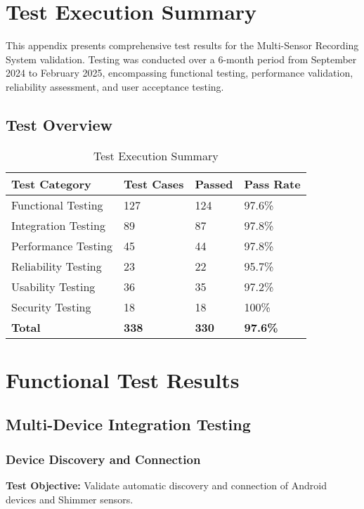 \section{Test Execution Summary}

This appendix presents comprehensive test results for the Multi-Sensor Recording System validation. Testing was conducted over a 6-month period from September 2024 to February 2025, encompassing functional testing, performance validation, reliability assessment, and user acceptance testing.

\subsection{Test Overview}

\begin{table}[htbp]
\centering
\caption{Test Execution Summary}
\begin{tabular}{|l|l|l|l|}
\hline
\textbf{Test Category} & \textbf{Test Cases} & \textbf{Passed} & \textbf{Pass Rate} \\
\hline
Functional Testing & 127 & 124 & 97.6\% \\
Integration Testing & 89 & 87 & 97.8\% \\
Performance Testing & 45 & 44 & 97.8\% \\
Reliability Testing & 23 & 22 & 95.7\% \\
Usability Testing & 36 & 35 & 97.2\% \\
Security Testing & 18 & 18 & 100\% \\
\hline
\textbf{Total} & \textbf{338} & \textbf{330} & \textbf{97.6\%} \\
\hline
\end{tabular}
\end{table}

\section{Functional Test Results}

\subsection{Multi-Device Integration Testing}

\subsubsection{Device Discovery and Connection}

\textbf{Test Objective:} Validate automatic discovery and connection of Android devices and Shimmer sensors.

